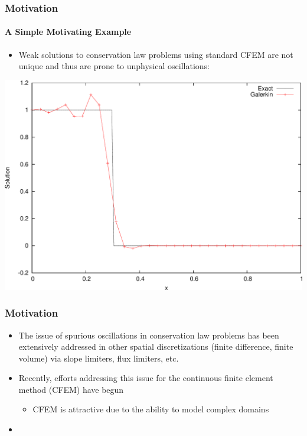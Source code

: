 \documentclass{beamer}
\begin{document}
\begin{frame}
\frametitle{Motivation}
\framesubtitle{A Simple Motivating Example}

\begin{itemize}
   \item Weak solutions to conservation law problems using standard CFEM
      are not unique and thus are prone to unphysical oscillations:
\end{itemize}
   \begin{center}
      \includegraphics[height=0.6\textheight]{./figures/advection_Galerkin.pdf}
   \end{center}

\end{frame}
\begin{frame}
\frametitle{Motivation}

\begin{itemize}
  \item The issue of spurious oscillations in conservation law problems has
    been extensively addressed in other spatial discretizations (finite difference,
    finite volume) via slope limiters, flux limiters, etc.
  \item Recently, efforts addressing this issue for the continuous finite
    element method (CFEM) have begun
  \begin{itemize}
    \item CFEM is attractive due to the ability to model complex domains
  \end{itemize}
  \item 
\end{itemize}

\end{frame}
\end{document}
